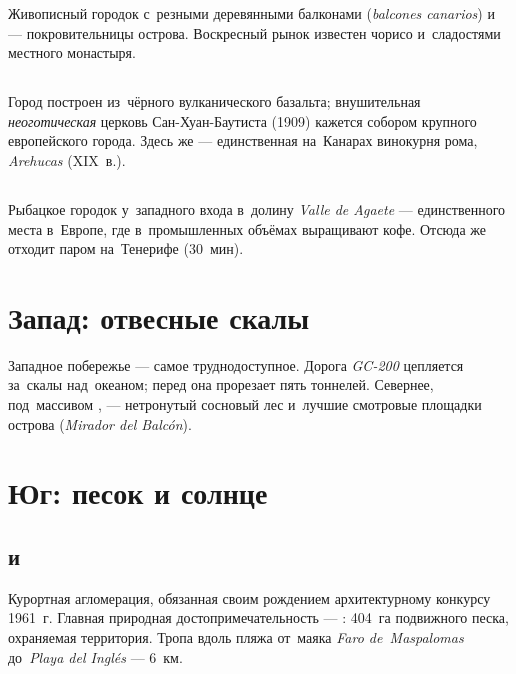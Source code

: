 
Живописный городок с~резными деревянными балконами
(\textit{balcones canarios}) и~
--- покровительницы острова. Воскресный рынок известен
чорисо и~сладостями местного монастыря.

\subsection*{}

Город построен из~чёрного вулканического базальта; внушительная
\textit{неоготическая} церковь Сан-Хуан-Баутиста (1909) кажется
собором крупного европейского города. Здесь же --- единственная
на~Канарах винокурня рома, \textit{Arehucas} (XIX~в.).

\subsection*{}

Рыбацкое городок у~западного входа в~долину \textit{Valle de
Agaete} --- единственного места в~Европе, где в~промышленных
объёмах выращивают кофе. Отсюда же отходит паром на~Тенерифе
(30~мин).

\section{Запад: отвесные скалы}

Западное побережье --- самое труднодоступное. Дорога \textit{GC-200}
цепляется за~скалы над~океаном; перед 
она прорезает пять тоннелей. Севернее, под~массивом
, --- нетронутый сосновый лес и~лучшие смотровые
площадки острова (\textit{Mirador del Balcón}).

\section{Юг: песок и солнце}

\subsection*{ и~}

Курортная агломерация, обязанная своим рождением архитектурному
конкурсу 1961~г. Главная природная достопримечательность ---
: 404~га подвижного песка, охраняемая
территория. Тропа вдоль пляжа от~маяка \textit{Faro de~Maspalomas}
до~\textit{Playa del Inglés} --- 6~км.

